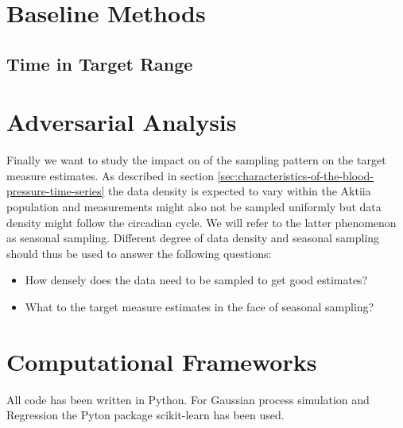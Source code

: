 \section{Baseline Methods}\label{sec:baseline-methods}

\subsection{Time in Target Range}






\section{Adversarial Analysis}\label{sec:adversarial-analysis}

Finally we want to study the impact on of the sampling pattern on the target measure estimates.
As described in section \ref{sec:characteristics-of-the-blood-pressure-time-series}
the data density is expected to vary within the Aktiia population and
measurements might
also not be sampled uniformly but data density might follow the circadian cycle.
We will refer to the latter phenomenon as seasonal sampling.
Different degree of data density and seasonal sampling should thus be used to
answer the following questions:
\begin{itemize}
    \item How densely does the data need to be sampled to get good estimates?
    \item What to the target measure estimates in the face of seasonal sampling?
\end{itemize}



\section{Computational Frameworks}

All code has been written in Python.
For Gaussian process simulation and Regression the Pyton package scikit-learn
has been used.
















